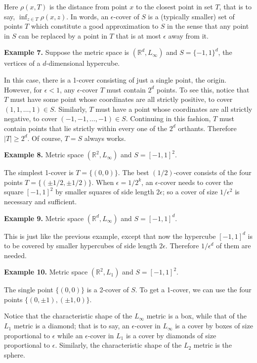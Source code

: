 \documentclass{article}
\begin{document}
Here $\rho(x, T)$ is the distance from point $x$ to the closest point in set $T$, that is to say, $\inf _{z \in T} \rho(x, z)$. In words, an $\epsilon$-cover of $S$ is a (typically smaller) set of points $T$ which constitute a good approximation to $S$ in the sense that any point in $S$ can be replaced by a point in $T$ that is at most $\epsilon$ away from it.

\textbf{Example 7.} Suppose the metric space is $(\mathbb{R}^{d}, L_{\infty})$ and $S=\{-1,1\}^{d}$, the vertices of a $d$-dimensional hypercube.

In this case, there is a 1-cover consisting of just a single point, the origin. However, for $\epsilon<1$, any $\epsilon$-cover $T$ must contain $2^{d}$ points. To see this, notice that $T$ must have some point whose coordinates are all strictly positive, to cover $(1,1, \ldots, 1) \in S$. Similarly, $T$ must have a point whose coordinates are all strictly negative, to cover $(-1,-1, \ldots,-1) \in S$. Continuing in this fashion, $T$ must contain points that lie strictly within every one of the $2^{d}$ orthants. Therefore $|T| \geq 2^{d}$. Of course, $T=S$ always works.

\textbf{Example 8.} Metric space $(\mathbb{R}^{2}, L_{\infty})$ and $S=[-1,1]^{2}$.

The simplest 1-cover is $T=\{(0,0)\}$. The best $(1 / 2)$-cover consists of the four points $T=\{( \pm 1 / 2, \pm 1 / 2)\}$. When $\epsilon=1 / 2^{k}$, an $\epsilon$-cover needs to cover the square $[-1,1]^{2}$ by smaller squares of side length $2 \epsilon$; so a cover of size $1 / \epsilon^{2}$ is necessary and sufficient.

\textbf{Example 9.} Metric space $(\mathbb{R}^{d}, L_{\infty})$ and $S=[-1,1]^{d}$.

This is just like the previous example, except that now the hypercube $[-1,1]^{d}$ is to be covered by smaller hypercubes of side length $2 \epsilon$. Therefore $1 / \epsilon^{d}$ of them are needed.

\textbf{Example 10.} Metric space $(\mathbb{R}^{2}, L_{1})$ and $S=[-1,1]^{2}$.

The single point $\{(0,0)\}$ is a 2-cover of $S$. To get a 1-cover, we can use the four points $\{(0, \pm 1),( \pm 1,0)\}$.

Notice that the characteristic shape of the $L_{\infty}$ metric is a box, while that of the $L_{1}$ metric is a diamond; that is to say, an $\epsilon$-cover in $L_{\infty}$ is a cover by boxes of size proportional to $\epsilon$ while an $\epsilon$-cover in $L_{1}$ is a cover by diamonds of size proportional to $\epsilon$. Similarly, the characteristic shape of the $L_{2}$ metric is the sphere.
\end{document}
